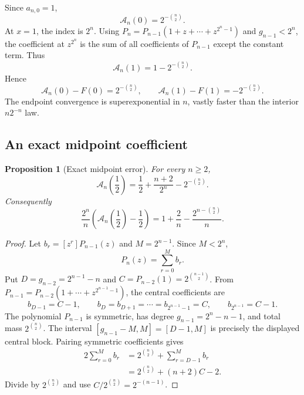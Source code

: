 \documentclass[11pt,oneside]{article}
\newtheorem{proposition}[theorem]{Proposition}
\theoremstyle{definition}
\theoremstyle{remark}
\begin{document}
Since $a_{n,0}=1$,
\begin{equation}
 \mathcal A_n(0)=2^{-\binom n2}.                            \label{eq:A-zero}
\end{equation}
At $x=1$, the index is $2^n$.  Using
$P_n=P_{n-1}(1+z+\cdots+z^{2^n-1})$ and
$g_{n-1}<2^n$, the coefficient at $z^{2^n}$ is the sum of all coefficients of
$P_{n-1}$ except the constant term.  Thus
\begin{equation}
 \mathcal A_n(1)=1-2^{-\binom n2}.                          \label{eq:A-one}
\end{equation}
Hence
\begin{equation}
 \mathcal A_n(0)-F(0)=2^{-\binom n2},
 \qquad
 \mathcal A_n(1)-F(1)=-2^{-\binom n2}.                     \label{eq:endpoint-errors}
\end{equation}
The endpoint convergence is superexponential in $n$, vastly faster than the
interior $n2^{-n}$ law.

\subsection{An exact midpoint coefficient}

\begin{proposition}[Exact midpoint error]
\label{prop:midpoint-exact}
For every $n\ge2$,
\begin{equation}
 \boxed{\displaystyle
 \mathcal A_n\!\left(\frac12\right)
 =\frac12+\frac{n+2}{2^n}-2^{-\binom n2}.}                 \label{eq:midpoint-exact}
\end{equation}
Consequently
\begin{equation}
 \frac{2^n}{n}
 \left(\mathcal A_n\!\left(\frac12\right)-\frac12\right)
 =1+\frac2n-\frac{2^{n-\binom n2}}{n}.                    \label{eq:midpoint-scaled}
\end{equation}
\end{proposition}

\begin{proof}
Let $b_r=[z^r]P_{n-1}(z)$ and $M=2^{n-1}$.  Since $M<2^n$,
\begin{equation*}
 [z^M]P_n(z)=\sum_{r=0}^{M}b_r.
\end{equation*}
Put $D=g_{n-2}=2^{n-1}-n$ and
$C=P_{n-2}(1)=2^{\binom{n-1}{2}}$.  From
$P_{n-1}=P_{n-2}(1+\cdots+z^{2^{n-1}-1})$, the central coefficients are
\begin{equation*}
 b_{D-1}=C-1,
 \qquad b_D=b_{D+1}=\cdots=b_{2^{n-1}-1}=C,
 \qquad b_{2^{n-1}}=C-1.
\end{equation*}
The polynomial $P_{n-1}$ is symmetric, has degree
$g_{n-1}=2^n-n-1$, and total mass $2^{\binom n2}$.  The interval
$[g_{n-1}-M,M]=[D-1,M]$ is precisely the displayed central block.  Pairing
symmetric coefficients gives
\begin{align*}
 2\sum_{r=0}^{M}b_r
 &=2^{\binom n2}+\sum_{r=D-1}^{M}b_r\\
 &=2^{\binom n2}+(n+2)C-2.
\end{align*}
Divide by $2^{\binom n2}$ and use
$C/2^{\binom n2}=2^{-(n-1)}$.
\end{proof}
\end{document}
